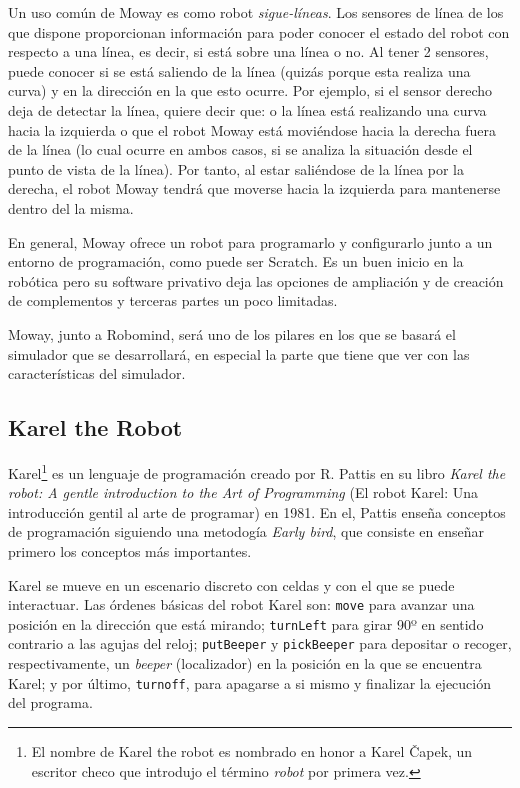 Un uso común de Moway es como robot \emph{sigue-líneas}. Los sensores de línea de los que dispone proporcionan información para poder conocer el estado del robot con respecto a una línea, es decir, si está sobre una línea o no. Al tener 2 sensores, puede conocer si se está saliendo de la línea (quizás porque esta realiza una curva) y en la dirección en la que esto ocurre. Por ejemplo, si el sensor derecho deja de detectar la línea, quiere decir que: o la línea está realizando una curva hacia la izquierda o que el robot Moway está moviéndose hacia la derecha fuera de la línea (lo cual ocurre en ambos casos, si se analiza la situación desde el punto de vista de la línea). Por tanto, al estar saliéndose de la línea por la derecha, el robot Moway tendrá que moverse hacia la izquierda para mantenerse dentro del la misma. 


En general, Moway ofrece un robot para programarlo y configurarlo junto a un entorno de programación, como puede ser Scratch. Es un buen inicio en la robótica pero su software privativo deja las opciones de ampliación y de creación de complementos y terceras partes un poco limitadas.

Moway, junto a Robomind, será uno de los pilares en los que se basará el simulador que se desarrollará, en especial la parte que tiene que ver con las características del simulador.



\subsection{Karel the Robot}
\label{sec:karel-the-robot}


Karel\footnote{El nombre de Karel the robot es nombrado en honor a Karel Čapek, un escritor checo que introdujo el término \emph{robot} por primera vez.} es un lenguaje de programación creado por R. Pattis en su libro \emph{Karel the robot: A gentle introduction to the Art of Programming} (El robot Karel: Una introducción gentil al arte de programar) en 1981\cite{pattis1981karel}. En el, Pattis enseña conceptos de programación siguiendo una metodogía \emph{Early bird}\cite{early-bird}, que consiste en enseñar primero los conceptos más importantes.

Karel se mueve en un escenario discreto con celdas y con el que se puede interactuar. Las órdenes básicas del robot Karel son: \texttt{move} para avanzar una posición en la dirección que está mirando; \texttt{turnLeft} para girar 90º en sentido contrario a las agujas del reloj; \texttt{putBeeper} y \texttt{pickBeeper} para depositar o recoger, respectivamente, un \emph{beeper} (localizador) en la posición en la que se encuentra Karel; y por último, \texttt{turnoff}, para apagarse a si mismo y finalizar la ejecución del programa.

